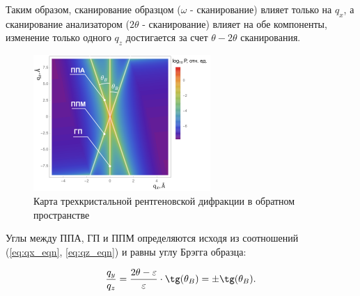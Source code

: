 Таким образом, сканирование образцом ($\omega$ - сканирование) влияет только на $q_x$, а
сканирование анализатором ($2\theta$ - сканирование) влияет на обе компоненты,
 изменение только одного $q_z$ достигается за счет $\theta-2\theta$ сканирования.

\begin{figure}[H]
  \centering
  \includegraphics[width=0.6\textwidth]{images/triple_map_reciprocal_space.png}
  \caption{Карта трехкристальной рентгеновской дифракции в обратном пространстве}
  \label{ris:triple_map_reciprocal_space}
\end{figure}

Углы между ППА, ГП и ППМ определяются исходя из соотношений (\ref{eq:qx_eqn}, \ref{eq:qz_eqn}) и равны углу Брэгга образца:

\begin{equation}
  \frac{q_y}{q_z} = \frac{2\theta - \varepsilon}{\varepsilon} \cdot \tg (\theta_B) = \pm \tg (\theta_B).
  \label{eq:qz_eqn}
\end{equation}
